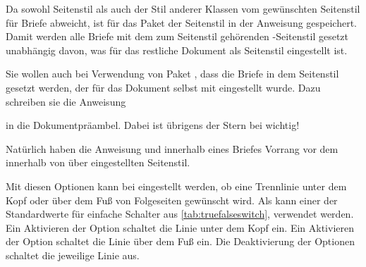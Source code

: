 Da sowohl Seitenstil  als auch der Stil
 anderer Klassen vom gewünschten
Seitenstil für Briefe abweicht, ist für das Paket
 der
Seitenstil
%
 in der Anweisung
 gespeichert. Damit werden alle Briefe mit dem zum
Seitenstil 
gehörenden
\hyperref[desc:\LabelBase.pagestyle.plain.letter]{}-Seitenstil
gesetzt unabhängig davon, was für das restliche Dokument als Seitenstil
eingestellt ist.
\begin{Example}
  Sie wollen auch bei Verwendung von Paket , dass die
  Briefe in dem Seitenstil gesetzt werden, der für das Dokument selbst mit
   eingestellt wurde. Dazu schreiben sie die
  Anweisung
\begin{lstcode}
  \renewcommand*{\letterpagestyle}{}
\end{lstcode}
  in die Dokumentpräambel. Dabei ist übrigens der Stern bei
   wichtig!%
\end{Example}
Natürlich haben die Anweisung  und
 innerhalb eines Briefes Vorrang vor dem
innerhalb von  über 
eingestellten Seitenstil.%
\EndIndexGroup


\begin{Declaration}
\end{Declaration}%
Mit diesen Optionen kann bei  eingestellt
werden, ob eine Trennlinie unter dem
Kopf oder über dem Fuß von
Folgeseiten gewünscht wird. Als  kann einer der
Standardwerte für einfache Schalter aus \autoref{tab:truefalseswitch},
 verwendet
werden. Ein Aktivieren der Option
 schaltet die Linie unter dem Kopf
ein. Ein Aktivieren der Option
 schaltet die Linie über dem Fuß ein. Die Deaktivierung
der Optionen schaltet die jeweilige Linie aus.

